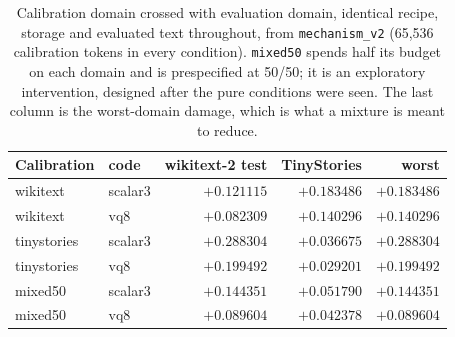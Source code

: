 \begin{table}[t]
\centering
\small
\begin{tabular}{llrrr}
\toprule
Calibration & code & wikitext-2 test & TinyStories & worst \\
\midrule
wikitext & scalar3 & $+0.121115$ & $+0.183486$ & $\mathbf{+0.183486}$ \\
wikitext & vq8 & $+0.082309$ & $+0.140296$ & $\mathbf{+0.140296}$ \\
\midrule
tinystories & scalar3 & $+0.288304$ & $+0.036675$ & $\mathbf{+0.288304}$ \\
tinystories & vq8 & $+0.199492$ & $+0.029201$ & $\mathbf{+0.199492}$ \\
\midrule
mixed50 & scalar3 & $+0.144351$ & $+0.051790$ & $\mathbf{+0.144351}$ \\
mixed50 & vq8 & $+0.089604$ & $+0.042378$ & $\mathbf{+0.089604}$ \\
\bottomrule
\end{tabular}
\caption{Calibration domain crossed with evaluation domain, identical recipe, storage and evaluated text throughout, from \texttt{mechanism\_v2} (65,536 calibration tokens in every condition). \texttt{mixed50} spends half its budget on each domain and is prespecified at 50/50; it is an exploratory intervention, designed after the pure conditions were seen. The last column is the worst-domain damage, which is what a mixture is meant to reduce.}
\label{tab:calibration}
\end{table}
